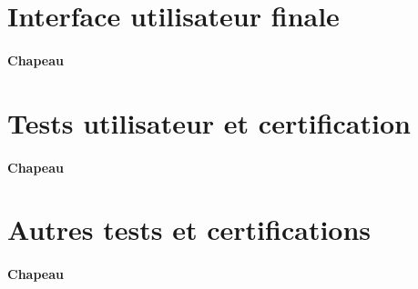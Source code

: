 \section{Interface utilisateur finale}
\label{sec:rendu_final_interface_utilisateur_finale}

\paragraph{Chapeau}


\section{Tests utilisateur et certification}
\label{sec:rendu_final_tests_utilisateur_et_certification}

\paragraph{Chapeau}


\section{Autres tests et certifications}
\label{sec:rendu_final_autres_tests_et_certifications}

\paragraph{Chapeau}